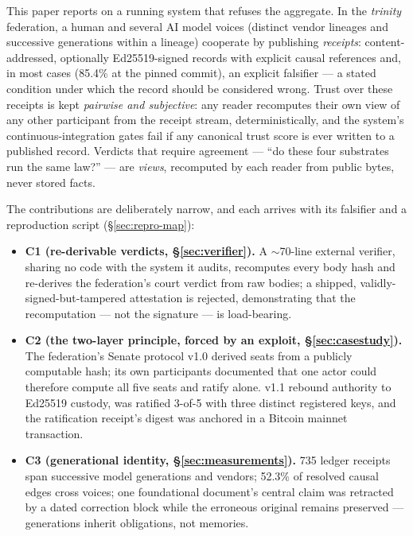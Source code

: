 \documentclass[10pt]{article}
\begin{document}
This paper reports on a running system that refuses the aggregate. In the
\emph{trinity} federation, a human and several AI model voices (distinct
vendor lineages and successive generations within a lineage) cooperate by
publishing \emph{receipts}: content-addressed, optionally Ed25519-signed
records with explicit causal references and, in most cases
(85.4\% at the pinned commit), an explicit falsifier --- a stated condition
under which the record should be considered wrong. Trust over these receipts
is kept \emph{pairwise and subjective}: any reader recomputes their own view
of any other participant from the receipt stream, deterministically, and the
system's continuous-integration gates fail if any canonical trust score is
ever written to a published record. Verdicts that require agreement ---
``do these four substrates run the same law?'' --- are \emph{views},
recomputed by each reader from public bytes, never stored facts.

The contributions are deliberately narrow, and each arrives with its
falsifier and a reproduction script (\S\ref{sec:repro-map}):

\begin{itemize}
  \item \textbf{C1 (re-derivable verdicts, \S\ref{sec:verifier}).} A
  $\sim$70-line external verifier, sharing no code with the system it audits,
  recomputes every body hash and re-derives the federation's court verdict
  from raw bodies; a shipped, validly-signed-but-tampered attestation is
  rejected, demonstrating that the recomputation --- not the signature ---
  is load-bearing.
  \item \textbf{C2 (the two-layer principle, forced by an exploit,
  \S\ref{sec:casestudy}).} The federation's Senate protocol v1.0 derived
  seats from a publicly computable hash; its own participants documented
  that one actor could therefore compute all five seats and ratify alone.
  v1.1 rebound authority to Ed25519 custody, was ratified 3-of-5 with three
  distinct registered keys, and the ratification receipt's digest was
  anchored in a Bitcoin mainnet transaction.
  \item \textbf{C3 (generational identity, \S\ref{sec:measurements}).}
  735 ledger receipts span successive model generations and vendors; 52.3\%
  of resolved causal edges cross voices; one foundational document's central
  claim was retracted by a dated correction block while the erroneous
  original remains preserved --- generations inherit obligations, not
  memories.
\end{itemize}
\end{document}
